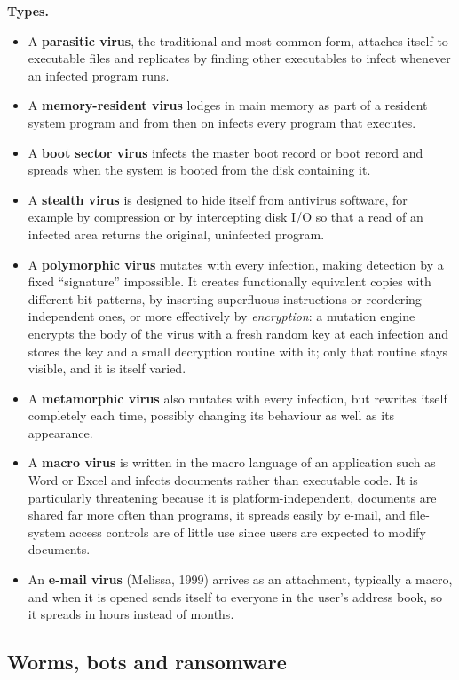 \textbf{Types.}
\begin{itemize}
  \item A \textbf{parasitic virus}, the traditional and most common form, attaches itself to executable files and replicates by finding other executables to infect whenever an infected program runs.
  \item A \textbf{memory-resident virus} lodges in main memory as part of a resident system program and from then on infects every program that executes.
  \item A \textbf{boot sector virus} infects the master boot record or boot record and spreads when the system is booted from the disk containing it.
  \item A \textbf{stealth virus} is designed to hide itself from antivirus software, for example by compression or by intercepting disk I/O so that a read of an infected area returns the original, uninfected program.
  \item A \textbf{polymorphic virus} mutates with every infection, making detection by a fixed ``signature'' impossible. It creates functionally equivalent copies with different bit patterns, by inserting superfluous instructions or reordering independent ones, or more effectively by \emph{encryption}: a mutation engine encrypts the body of the virus with a fresh random key at each infection and stores the key and a small decryption routine with it; only that routine stays visible, and it is itself varied.
  \item A \textbf{metamorphic virus} also mutates with every infection, but rewrites itself completely each time, possibly changing its behaviour as well as its appearance.
  \item A \textbf{macro virus} is written in the macro language of an application such as Word or Excel and infects documents rather than executable code. It is particularly threatening because it is platform-independent, documents are shared far more often than programs, it spreads easily by e-mail, and file-system access controls are of little use since users are expected to modify documents.
  \item An \textbf{e-mail virus} (Melissa, 1999) arrives as an attachment, typically a macro, and when it is opened sends itself to everyone in the user's address book, so it spreads in hours instead of months.
\end{itemize}

\subsection{Worms, bots and ransomware \new}

